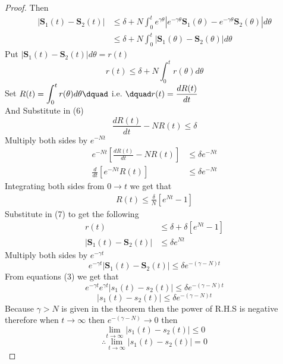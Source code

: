 \begin{proof}[\textcolor{theme}{Proof}]
    \par
    Then
    \begin{align*}
        |\mathbf{S}_1(t) - \mathbf{S}_2(t)| & \leq \delta  + N \int_{0}^{t} e^{\gamma \theta} \left\lvert e^{-\gamma \theta}\mathbf{S}_1(\theta) -e^{-\gamma \theta} \mathbf{S}_2(\theta) \right\rvert d\theta
        \\
                                            & \leq \delta  + N \int_{0}^{t} \left\lvert \mathbf{S}_1(\theta) - \mathbf{S}_2(\theta) \right\rvert d\theta
    \end{align*}
    Put $\left\lvert \mathbf{S}_1(t) - \mathbf{S}_2(t) \right\rvert d\theta = r(t)$
    \begin{equation}
        r(t) \leq \delta  + N \int_{0}^{t} r(\theta) d\theta
    \end{equation}
    Set $\displaystyle R(t) = \int_{0}^{t} r(\theta)d\theta \dquad$ i.e. $\dquad \displaystyle r(t) = \frac{dR(t)}{dt} $
    \\
    And Substitute in (6)
    \begin{equation}
        \frac{dR(t)}{dt} - NR(t) \leq \delta
    \end{equation}
    Multiply both sides by $e^{-Nt}$
    \begin{align*}
        e^{-Nt}\left[\frac{dR(t)}{dt} - NR(t)\right] & \leq \delta e^{-Nt}
        \\
        \frac{d}{dt}\left[e^{-Nt}R(t)\right]         & \leq \delta e^{-Nt}
    \end{align*}
    Integrating both sides from $0 \to t$ we get that
    \begin{align*}
        R(t) \leq \frac{\delta}{N}\left[e^{Nt}-1\right]
    \end{align*}
    Substitute in (7) to get the following
    \begin{align*}
        r(t)                                & \leq \delta + \delta\left[e^{Nt}-1\right]
        \\
        |\mathbf{S}_1(t) - \mathbf{S}_2(t)| & \leq \delta e^{Nt}
    \end{align*}
    Multiply both sides by $e^{-\gamma t}$
    \[
        e^{-\gamma t}|\mathbf{S}_1(t) - \mathbf{S}_2(t)|  \leq \delta e^{-(\gamma-N)t}
    \]
    From equations (3) we get that
    \[
        e^{-\gamma t}e^{\gamma t}|s_1(t) - s_2(t)|  \leq \delta e^{-(\gamma-N)t}
    \]
    \[
        |s_1(t) - s_2(t)|  \leq \delta e^{-(\gamma-N)t}
    \]
    Because $\gamma > N$ is given in the theorem then the power of R.H.S is negative therefore
    when $t \to \infty$ then $e^{-(\gamma-N)} \to 0$ then
    \[
        \lim_{t \to \infty} |s_1(t) - s_2(t)| \leq 0
    \]
    \[
        \therefore \lim_{t \to \infty} |s_1(t) - s_2(t)| = 0
    \]
\end{proof}
